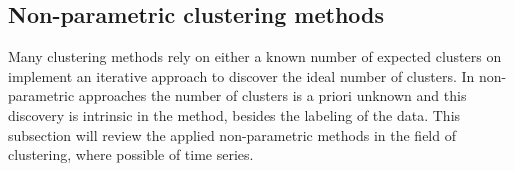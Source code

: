 %

\subsection{Non-parametric clustering methods}\label{sec:lit_review_nonparametric}
Many clustering methods rely on either a known number of expected clusters on implement an iterative approach to discover the ideal number of clusters.
In non-parametric approaches the number of clusters is a priori unknown and this discovery is intrinsic in the method, besides the labeling of the data.
This subsection will review the applied non-parametric methods in the field of clustering, where possible of time series.